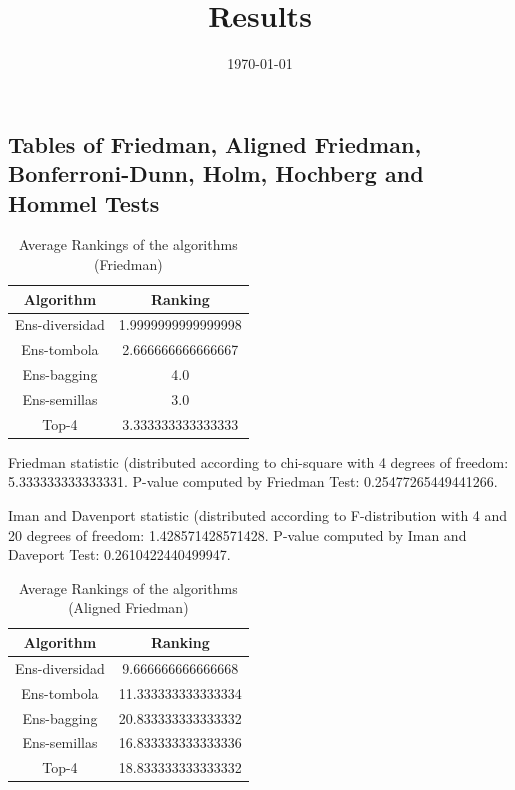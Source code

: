 \documentclass[a4paper,10pt]{article}
\title{Results}
\author{}
\date{\today}
\begin{document}
\begin{landscape}
\oddsidemargin 0in \topmargin 0in\maketitle
\section{Tables of Friedman, Aligned Friedman, Bonferroni-Dunn, Holm, Hochberg and Hommel Tests}
\begin{table}[!htp]
\centering
\caption{Average Rankings of the algorithms (Friedman)
}\begin{tabular}{c|c}
Algorithm&Ranking\\
\hline
Ens-diversidad&1.9999999999999998\\
Ens-tombola&2.666666666666667\\
Ens-bagging&4.0\\
Ens-semillas&3.0\\
Top-4&3.333333333333333\\
\end{tabular}
\end{table}


Friedman statistic (distributed according to chi-square with 4 degrees of freedom: 5.333333333333331. 
P-value computed by Friedman Test: 0.25477265449441266.\newline

Iman and Davenport statistic (distributed according to F-distribution with 4 and 20 degrees of freedom: 1.428571428571428. 
P-value computed by Iman and Daveport Test: 0.2610422440499947.\newline


\newpage

\begin{table}[!htp]
\centering
\caption{Average Rankings of the algorithms (Aligned Friedman)
}\begin{tabular}{c|c}
Algorithm&Ranking\\
\hline
Ens-diversidad&9.666666666666668\\
Ens-tombola&11.333333333333334\\
Ens-bagging&20.833333333333332\\
Ens-semillas&16.833333333333336\\
Top-4&18.833333333333332\\
\end{tabular}
\end{table}



\end{landscape}
\end{document}
